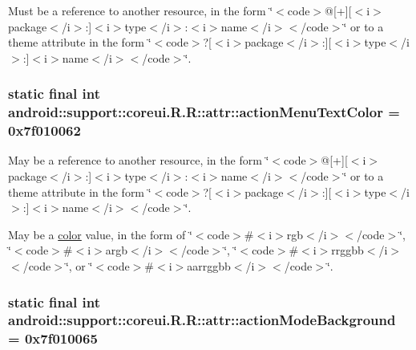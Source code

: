 Must be a reference to another resource, in the form \char`\"{}$<$code$>$@\mbox{[}+\mbox{]}\mbox{[}$<$i$>$package$<$/i$>$:\mbox{]}$<$i$>$type$<$/i$>$:$<$i$>$name$<$/i$>$$<$/code$>$\char`\"{} or to a theme attribute in the form \char`\"{}$<$code$>$?\mbox{[}$<$i$>$package$<$/i$>$:\mbox{]}\mbox{[}$<$i$>$type$<$/i$>$:\mbox{]}$<$i$>$name$<$/i$>$$<$/code$>$\char`\"{}. \hypertarget{classandroid_1_1support_1_1coreui_1_1_r_1_1attr_befd5c851d1dcf47183a3335c5a2bebf}{
\subsubsection[{actionMenuTextColor}]{\setlength{\rightskip}{0pt plus 5cm}static final int android::support::coreui.R.R::attr::actionMenuTextColor = 0x7f010062}}
\label{classandroid_1_1support_1_1coreui_1_1_r_1_1attr_befd5c851d1dcf47183a3335c5a2bebf}


May be a reference to another resource, in the form \char`\"{}$<$code$>$@\mbox{[}+\mbox{]}\mbox{[}$<$i$>$package$<$/i$>$:\mbox{]}$<$i$>$type$<$/i$>$:$<$i$>$name$<$/i$>$$<$/code$>$\char`\"{} or to a theme attribute in the form \char`\"{}$<$code$>$?\mbox{[}$<$i$>$package$<$/i$>$:\mbox{]}\mbox{[}$<$i$>$type$<$/i$>$:\mbox{]}$<$i$>$name$<$/i$>$$<$/code$>$\char`\"{}. 

May be a \hyperlink{classandroid_1_1support_1_1coreui_1_1_r_1_1color}{color} value, in the form of \char`\"{}$<$code$>$\#$<$i$>$rgb$<$/i$>$$<$/code$>$\char`\"{}, \char`\"{}$<$code$>$\#$<$i$>$argb$<$/i$>$$<$/code$>$\char`\"{}, \char`\"{}$<$code$>$\#$<$i$>$rrggbb$<$/i$>$$<$/code$>$\char`\"{}, or \char`\"{}$<$code$>$\#$<$i$>$aarrggbb$<$/i$>$$<$/code$>$\char`\"{}. \hypertarget{classandroid_1_1support_1_1coreui_1_1_r_1_1attr_2c6c2649349110807938aefb8a634b68}{
\subsubsection[{actionModeBackground}]{\setlength{\rightskip}{0pt plus 5cm}static final int android::support::coreui.R.R::attr::actionModeBackground = 0x7f010065}}
\label{classandroid_1_1support_1_1coreui_1_1_r_1_1attr_2c6c2649349110807938aefb8a634b68}


